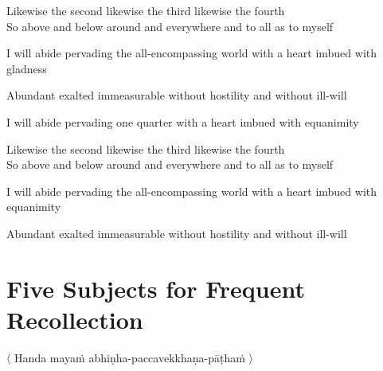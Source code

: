 \begin{english}
Likewise the second likewise the third likewise the fourth\\
So above and below around and everywhere and to all as to myself\\
\end{english}

\begin{english-hang}
I will abide pervading the all-encompassing world with a heart imbued with gladness\\
\end{english-hang}

\begin{english-hang}
Abundant exalted immeasurable without hostility and without ill-will
\end{english-hang}

\medskip

\begin{english-hang}
I will abide pervading one quarter with a heart imbued with equanimity\\
\end{english-hang}

\begin{english}
Likewise the second likewise the third likewise the fourth\\
So above and below around and everywhere and to all as to myself\\
\end{english}

\begin{english-hang}
I will abide pervading the all-encompassing world with a heart imbued with equanimity\\
\end{english-hang}

\begin{english-hang}
Abundant exalted immeasurable without hostility and without ill-will
\end{english-hang}

\suttaRef{[DN 13]}


\section{Five Subjects for Frequent Recollection}
\label{five-recollections}

\begin{leader}
  〈 Handa mayaṁ abhiṇha-paccavekkhaṇa-pāṭhaṁ 〉
\end{leader}

